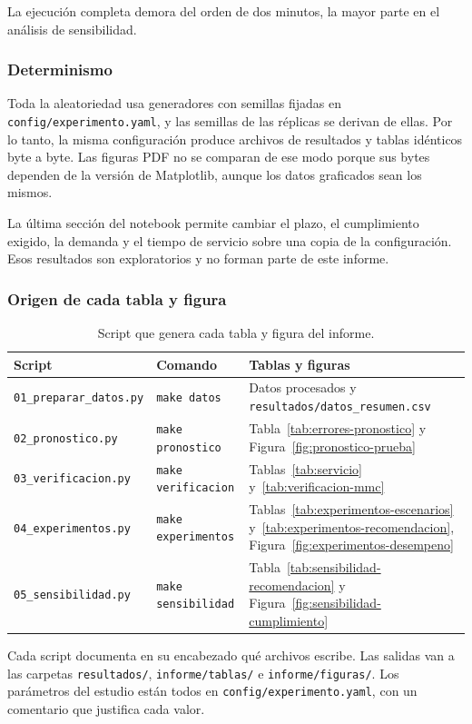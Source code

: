 La ejecución completa demora del orden de dos minutos, la mayor parte en el análisis de sensibilidad.

\subsubsection*{Determinismo}

Toda la aleatoriedad usa generadores con semillas fijadas en \nolinkurl{config/experimento.yaml}, y las semillas de las réplicas se derivan de ellas.
Por lo tanto, la misma configuración produce archivos de resultados y tablas idénticos byte a byte.
Las figuras PDF no se comparan de ese modo porque sus bytes dependen de la versión de Matplotlib, aunque los datos graficados sean los mismos.

La última sección del notebook permite cambiar el plazo, el cumplimiento exigido, la demanda y el tiempo de servicio sobre una copia de la configuración.
Esos resultados son exploratorios y no forman parte de este informe.

\subsubsection*{Origen de cada tabla y figura}

\begin{table}[htbp]
  \centering
  \caption{Script que genera cada tabla y figura del informe.}
  \label{tab:trazabilidad}
  \small
  \begin{tabular}{@{}ll>{\raggedright\arraybackslash}p{}@{}}
    \toprule
    Script & Comando & Tablas y figuras \\
    \midrule
    \texttt{01\_preparar\_datos.py} & \texttt{make datos} & Datos procesados y \texttt{resultados/datos\_resumen.csv} \\
    \texttt{02\_pronostico.py} & \texttt{make pronostico} & Tabla~\ref{tab:errores-pronostico} y Figura~\ref{fig:pronostico-prueba} \\
    \texttt{03\_verificacion.py} & \texttt{make verificacion} & Tablas~\ref{tab:servicio} y~\ref{tab:verificacion-mmc} \\
    \texttt{04\_experimentos.py} & \texttt{make experimentos} & Tablas~\ref{tab:experimentos-escenarios} y~\ref{tab:experimentos-recomendacion}, Figura~\ref{fig:experimentos-desempeno} \\
    \texttt{05\_sensibilidad.py} & \texttt{make sensibilidad} & Tabla~\ref{tab:sensibilidad-recomendacion} y Figura~\ref{fig:sensibilidad-cumplimiento} \\
    \bottomrule
  \end{tabular}
\end{table}

Cada script documenta en su encabezado qué archivos escribe.
Las salidas van a las carpetas \texttt{resultados/}, \texttt{informe/tablas/} e \texttt{informe/figuras/}.
Los parámetros del estudio están todos en \nolinkurl{config/experimento.yaml}, con un comentario que justifica cada valor.
